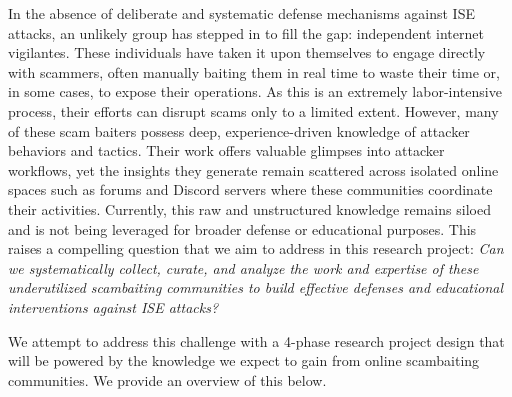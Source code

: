 In the absence of deliberate and systematic defense mechanisms against ISE attacks, an unlikely group has stepped in to fill the gap: independent internet vigilantes. These individuals have taken it upon themselves to engage directly with scammers, often manually baiting them in real time to waste their time or, in some cases, to expose their operations. As this is an extremely labor-intensive process, their efforts can disrupt scams only to a limited extent. However, many of these scam baiters possess deep, experience-driven knowledge of attacker behaviors and tactics. Their work offers valuable glimpses into attacker workflows, yet the insights they generate remain scattered across isolated online spaces such as forums and Discord servers where these communities coordinate their activities. Currently, this raw and unstructured knowledge remains siloed and is not being leveraged for broader defense or educational purposes. This raises a compelling question that we aim to address in this research project: \emph{Can we systematically collect, curate, and analyze the work and expertise of these underutilized scambaiting communities to build effective defenses and educational interventions against ISE attacks?}

We attempt to address this challenge with a 4-phase research project design that will be powered by the knowledge we expect to gain from online scambaiting communities. We provide an overview of this below.

